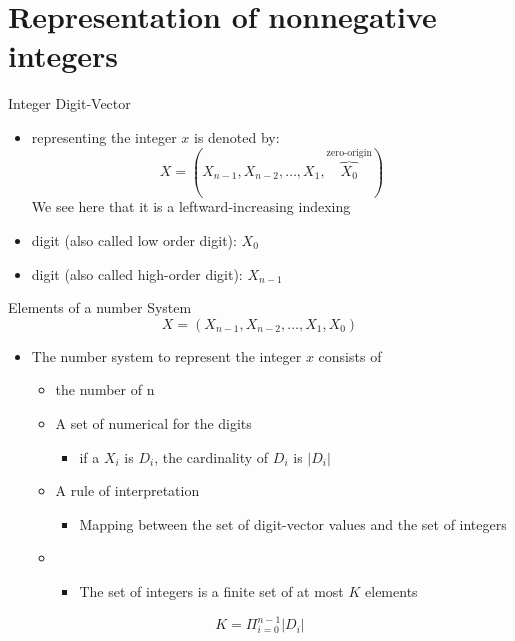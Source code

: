 \section{Representation of nonnegative integers}
\begin{parag}{Integer Digit-Vector}
    \begin{itemize}
        \item {} representing the integer $x$ is denoted by:
        \[X = (X_{n-1}, X_{n-2}, \dots, X_1, \overbrace{X_0}^{\text{zero-origin}})\]
        We see here that it is a leftward-increasing indexing
        \item {} digit (also called low order digit): $X_0$
        \item {} digit (also called high-order digit): $X_{n-1}$
    \end{itemize}
\end{parag}
\begin{parag}{Elements of a number System}
    \[X = (X_{n-1}, X_{n-2}, \dots, X_1, X_0)\]
    \begin{itemize}
        \item The number system to represent the integer $x$ consists of
        \begin{itemize}
            \item the number of  n
            \item A set of numerical  for the digits
            \begin{itemize}
                \item if a  $X_i$ is $D_i$, the cardinality of $D_i$ is $|D_i|$
            \end{itemize}
            \item A rule of interpretation
            \begin{itemize}
                \item Mapping between the set of digit-vector values and the set of integers
            \end{itemize}
            \item {}
            \begin{itemize}
                \item The set of integers is a finite set of at most $K$ elements
            \end{itemize}
        \end{itemize}
    \end{itemize}
    \begin{formule}
    \[K = \Pi_{i = 0}^{n-1} |D_i|\]
    \end{formule}
\end{parag}
